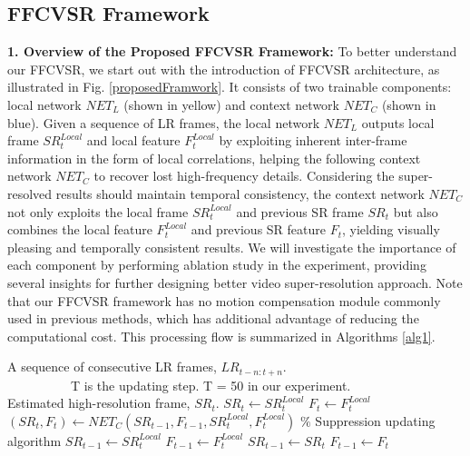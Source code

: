 \documentclass[letterpaper]{article} %
\begin{document}
\subsection{FFCVSR Framework}


\textbf{1. Overview of the Proposed FFCVSR Framework:} To better understand our FFCVSR, we start out with the introduction of FFCVSR architecture, as illustrated in Fig. \ref{proposedFramwork}. It consists of two trainable components: local network $NET_L$ (shown in yellow) and context network $NET_C$ (shown in blue). Given a sequence of LR frames, the local network $NET_L$ outputs local frame $SR^{Local}_t$ and local feature $F^{Local}_t$ by exploiting inherent inter-frame information in the form of local correlations, helping the following context network $NET_C$ to recover lost high-frequency details. Considering the super-resolved results should maintain temporal consistency, the context network $NET_C$ not only exploits the local frame $SR^{Local}_t$ and previous SR frame $SR_t$ but also combines the local feature $F^{Local}_t$ and previous SR feature $F_t$, yielding visually pleasing and temporally consistent results. We will investigate the importance of each component by performing ablation study in the experiment, providing several insights for further designing better video super-resolution approach. Note that our FFCVSR framework has no motion compensation module commonly used in previous methods, which has additional advantage of reducing the computational cost. This processing flow is summarized in Algorithms \ref{alg1}.




\begin{algorithm}
\caption{Frame and Feature-Context Video Super-Resolution}
\label{alg1}
\begin{algorithmic}
\REQUIRE A sequence of consecutive LR frames, $LR_{t-n:t+n}$. \\
         ~~~~~~~~~~T is the updating step. T = 50 in our experiment.\\
\ENSURE Estimated high-resolution frame, $SR_t$.
\STATE $SR_t \gets SR^{Local}_t$
\STATE $F_t \gets F^{Local}_t$
\ELSE
\STATE $(SR_t, F_t) \gets NET_C(SR_{t-1}, F_{t-1}, SR^{Local}_t, F^{Local}_t)$
\ENDIF
\ENDFOR
\STATE $\%$ Suppression updating algorithm
\STATE $ SR_{t-1} \gets SR^{Local}_t$
\STATE $ F_{t-1} \gets F^{Local}_t$
\ELSE
\STATE $ SR_{t-1} \gets SR_t$
\STATE $ F_{t-1} \gets F_t$
\ENDIF
\end{algorithmic}
\end{algorithm}
\end{document}
